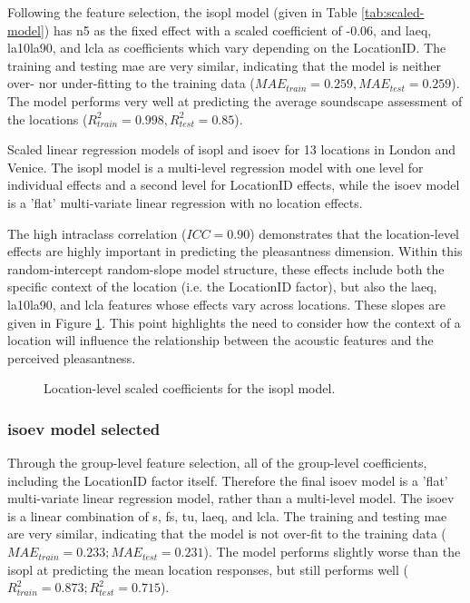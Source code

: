    Following the feature selection, the \gls{isopl} model (given in Table \ref{tab:scaled-model}) has \gls{n5} as the fixed effect with a scaled coefficient of -0.06, and \gls{laeq}, \gls{la10la90}, and \gls{lcla} as coefficients which vary depending on the LocationID. The training and testing \gls{mae} are very similar, indicating that the model is neither over- nor under-fitting to the training data ($MAE_{train}=0.259, MAE_{test}=0.259$). The model performs very well at predicting the average soundscape assessment of the locations ($R^2_{train}=0.998, R^2_{test}=0.85$).

   \begin{table}
     \label{tab:scaled-model}
     \caption{Scaled linear regression models of \gls{isopl} and \gls{isoev} for 13 locations in London and Venice. The \gls{isopl} model is a multi-level regression model with one level for individual effects and a second level for LocationID effects, while the \gls{isoev} model is a 'flat' multi-variate linear regression with no location effects.}
   \end{table}

   The high intraclass correlation ($ICC=0.90$) demonstrates that the location-level effects are highly important in predicting the pleasantness dimension. Within this random-intercept random-slope model structure, these effects include both the specific context of the location (i.e. the LocationID factor), but also the \gls{laeq}, \gls{la10la90}, and \gls{lcla} features whose effects vary across locations. These slopes are given in Figure \ref{fig:pl-slopes}. This point highlights the need to consider how the context of a location will influence the relationship between the acoustic features and the perceived pleasantness.

   \begin{figure}
     \label{fig:pl-slopes}
     \caption{Location-level scaled coefficients for the \gls{isopl} model.}
   \end{figure}

   \subsubsection{\gls{isoev} model selected}

   Through the group-level feature selection, all of the group-level coefficients, including the LocationID factor itself. Therefore the final \gls{isoev} model is a 'flat' multi-variate linear regression model, rather than a multi-level model. The \gls{isoev} is a linear combination of \gls{s}, \gls{fs}, \gls{tu}, \gls{laeq}, and \gls{lcla}. The training and testing \gls{mae} are very similar, indicating that the model is not over-fit to the training data ($MAE_{train}=0.233; MAE_{test}=0.231$). The model performs slightly worse than the \gls{isopl} at predicting the mean location responses, but still performs well ($R^2_{train}=0.873; R^2_{test}=0.715$).

